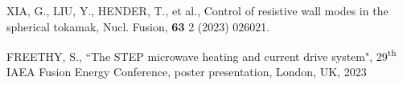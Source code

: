\documentclass[10pt, a4paper, twoside]{article}
\begin{document}
\begin{thebibliography}{9}
    XIA, G., LIU, Y., HENDER, T., et al.,
    Control of resistive wall modes in the spherical tokamak,
    Nucl. Fusion,
    \textbf{63} 2
    (2023)
    026021.

    FREETHY, S.,
    ``The STEP microwave heating and current drive system",
    29\textsuperscript{th} IAEA Fusion Energy Conference,
    poster presentation, 
    London, UK, 
    2023

\end{thebibliography}
\end{document}
